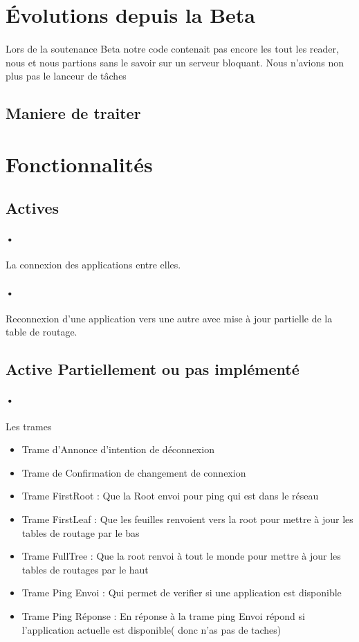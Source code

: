 \documentclass[a4paper,titlepage]{report}
\begin{document}
\pagebreak
\section{Évolutions depuis la Beta}
\paragraph{}
Lors de la soutenance Beta notre code contenait pas encore les tout les reader, nous et nous partions sans le savoir sur un serveur bloquant.
Nous n'avions non plus pas le lanceur de tâches 
\subsection{Maniere de traiter}






\section{Fonctionnalités}
\subsection{Actives}
\paragraph{•} La connexion des applications entre elles.
\paragraph{•} Reconnexion d'une application vers une autre avec mise à jour partielle de la table de routage.
\subsection{Active Partiellement ou pas implémenté}
\paragraph{•} Les trames
\begin{itemize}
\item Trame d'Annonce d'intention de déconnexion
\item Trame de Confirmation de changement de connexion
\item Trame FirstRoot : Que la Root envoi pour ping qui est dans le réseau
\item Trame FirstLeaf : Que les feuilles renvoient vers la root pour mettre à jour les tables de routage par le bas
\item Trame FullTree : Que la root renvoi à tout le monde pour mettre à jour les tables de routages par le haut
\item Trame Ping Envoi : Qui permet de verifier si une application est disponible
\item Trame Ping Réponse : En réponse à la trame ping Envoi répond si l'application actuelle est disponible( donc n'as pas de taches)
\end{itemize}
\end{document}
